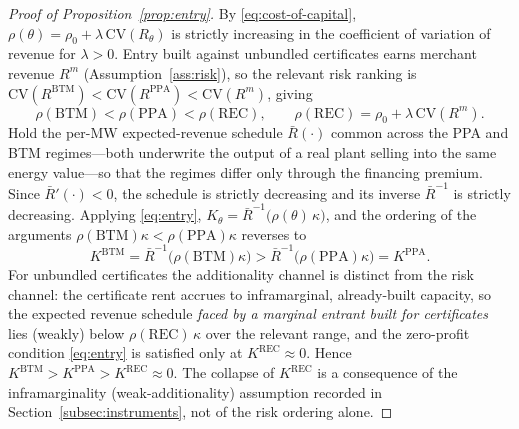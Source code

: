 \documentclass[a4paper,fleqn,longmktitle]{cas-sc}
\theoremstyle{plain}
\theoremstyle{definition}
\newcommand{\REC}{\mathrm{REC}}
\newcommand{\PPA}{\mathrm{PPA}}
\newcommand{\BTM}{\mathrm{BTM}}
\begin{document}
\begin{proof}[Proof of Proposition~\ref{prop:entry}]
By \eqref{eq:cost-of-capital}, $\rho(\theta)=\rho_0+\lambda\,\mathrm{CV}(R_\theta)$ is strictly increasing in the coefficient of variation of revenue for $\lambda>0$. Entry built against unbundled certificates earns merchant revenue $R^{m}$ (Assumption~\ref{ass:risk}), so the relevant risk ranking is $\mathrm{CV}(R^{\BTM})<\mathrm{CV}(R^{\PPA})<\mathrm{CV}(R^{m})$, giving
\begin{equation*}
    \rho(\BTM)<\rho(\PPA)<\rho(\REC),\qquad \rho(\REC)=\rho_0+\lambda\,\mathrm{CV}(R^{m}).
\end{equation*}
Hold the per-MW expected-revenue schedule $\bar R(\cdot)$ common across the PPA and BTM regimes---both underwrite the output of a real plant selling into the same energy value---so that the regimes differ only through the financing premium. Since $\bar R'(\cdot)<0$, the schedule is strictly decreasing and its inverse $\bar R^{-1}$ is strictly decreasing. Applying \eqref{eq:entry}, $K_\theta=\bar R^{-1}\!\big(\rho(\theta)\,\kappa\big)$, and the ordering of the arguments $\rho(\BTM)\kappa<\rho(\PPA)\kappa$ reverses to
\begin{equation*}
    K^{\BTM}=\bar R^{-1}\!\big(\rho(\BTM)\kappa\big)>\bar R^{-1}\!\big(\rho(\PPA)\kappa\big)=K^{\PPA}.
\end{equation*}
For unbundled certificates the additionality channel is distinct from the risk channel: the certificate rent accrues to inframarginal, already-built capacity, so the expected revenue schedule \emph{faced by a marginal entrant built for certificates} lies (weakly) below $\rho(\REC)\,\kappa$ over the relevant range, and the zero-profit condition \eqref{eq:entry} is satisfied only at $K^{\REC}\approx 0$. Hence $K^{\BTM}>K^{\PPA}>K^{\REC}\approx 0$. The collapse of $K^{\REC}$ is a consequence of the inframarginality (weak-additionality) assumption recorded in Section~\ref{subsec:instruments}, not of the risk ordering alone.
\end{proof}
\end{document}
